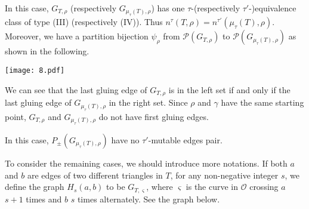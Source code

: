 \documentclass[10pt]{amsart}
\theoremstyle{theorems}
\begin{document}
In this case, $G_{T,\rho}$ (respectively $G_{\mu_{\tau}(T),\rho}$) has one $\tau$-(respectively $\tau'$-)equivalence class of type (III) (respectively (IV)). Thus $n^{\tau}(T,\rho)=n^{\tau'}(\mu_{\tau}(T),\rho)$. Moreover, we have a partition bijection $\psi_{\rho}$ from $\mathcal P(G_{T,\rho})$ to $\mathcal P(G_{\mu_{\tau}(T),\rho})$ as shown in the following.

\centerline{\texttt{[image: 8.pdf]}}

We can see that the last gluing edge of $G_{T,\rho}$ is in the left set if and only if the last gluing edge of $G_{\mu_{\tau}(T),\rho}$ in the right set. Since $\rho$ and $\gamma$ have the same starting point, $G_{T,\rho}$ and $G_{\mu_{\tau}(T),\rho}$ do not have first gluing edges.

\medskip

In this case, $P_{\pm}(G_{\mu_{\tau}(T),\rho})$ have no $\tau'$-mutable edges pair.

\medskip

To consider the remaining cases, we should introduce more notations. If both $a$ and $b$ are edges of two different triangles in $T$, for any non-negative integer $s$, we define the graph $H_s(a,b)$ to be $G_{T,\varsigma}$, where $\varsigma$ is the curve in $\mathcal O$ crossing $a$ $s+1$ times and $b$ $s$ times alternately. See the graph below.

%
%
%
\end{document}
